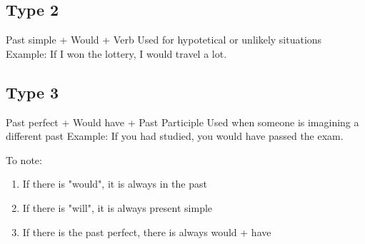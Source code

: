 \documentclass{article}
\begin{document}
    \subsection{Type 2}

    Past simple + Would + Verb\newline
    Used for hypotetical or unlikely situations\newline
    Example: If I won the lottery, I would travel a lot.\newline

    \subsection{Type 3}

    Past perfect + Would have + Past Participle\newline
    Used when someone is imagining a different past\newline
    Example: If you had studied, you would have passed the exam.\newline

    To note:
    \begin{enumerate}
        \item If there is "would", it is always in the past
        \item If there is "will", it is always present simple
        \item If there is the past perfect, there is always would + have
    \end{enumerate}
\end{document}
